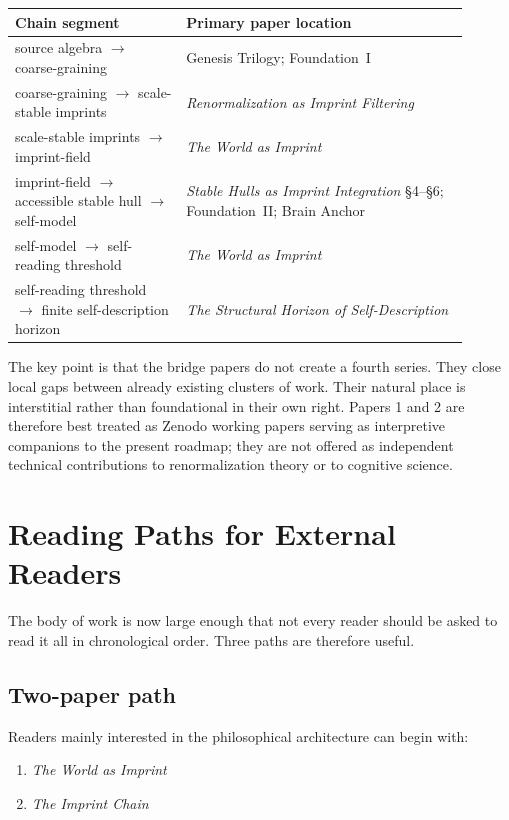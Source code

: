 \documentclass[12pt]{article}
\begin{document}
\begin{center}
\begin{tabular}{P{0.34\linewidth}P{0.56\linewidth}}
\toprule
\textbf{Chain segment} & \textbf{Primary paper location} \\
\midrule
source algebra $\to$ coarse-graining & Genesis Trilogy; Foundation~I \\
coarse-graining $\to$ scale-stable imprints & \emph{Renormalization as Imprint Filtering} \\
scale-stable imprints $\to$ imprint-field & \emph{The World as Imprint} \\
imprint-field $\to$ accessible stable hull $\to$ self-model & \emph{Stable Hulls as Imprint Integration} \S4--\S6; Foundation~II; Brain Anchor \\
self-model $\to$ self-reading threshold & \emph{The World as Imprint} \\
self-reading threshold $\to$ finite self-description horizon & \emph{The Structural Horizon of Self-Description} \\
\bottomrule
\end{tabular}
\end{center}

The key point is that the bridge papers do not create a fourth series. They close local gaps between already existing clusters of work. Their natural place is interstitial rather than foundational in their own right. Papers 1 and 2 are therefore best treated as Zenodo working papers serving as interpretive companions to the present roadmap; they are not offered as independent technical contributions to renormalization theory or to cognitive science.

\section{Reading Paths for External Readers}

The body of work is now large enough that not every reader should be asked to read it all in chronological order. Three paths are therefore useful.

\subsection{Two-paper path}

Readers mainly interested in the philosophical architecture can begin with:

\begin{enumerate}
\item \emph{The World as Imprint}
\item \emph{The Imprint Chain}
\end{enumerate}
\end{document}

